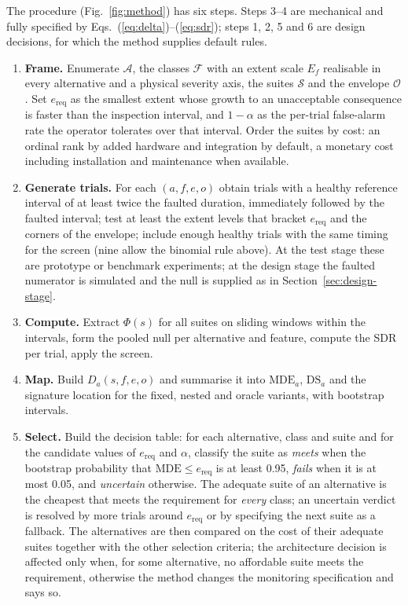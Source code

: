 The procedure (Fig.~\ref{fig:method}) has six steps. Steps 3--4 are mechanical and fully specified by Eqs.~(\ref{eq:delta})--(\ref{eq:sdr}); steps 1, 2, 5 and 6 are design decisions, for which the method supplies default rules.
\begin{enumerate}
  \item \textbf{Frame.} Enumerate $\mathcal{A}$, the classes $\mathcal{F}$ with an extent scale $E_f$ realisable in every alternative and a physical severity axis, the suites $\mathcal{S}$ and the envelope $\mathcal{O}$. Set $e_{\mathrm{req}}$ as the smallest extent whose growth to an unacceptable consequence is faster than the inspection interval, and $1-\alpha$ as the per-trial false-alarm rate the operator tolerates over that interval. Order the suites by cost: an ordinal rank by added hardware and integration by default, a monetary cost including installation and maintenance when available.
  \item \textbf{Generate trials.} For each $(a,f,e,o)$ obtain trials with a healthy reference interval of at least twice the faulted duration, immediately followed by the faulted interval; test at least the extent levels that bracket $e_{\mathrm{req}}$ and the corners of the envelope; include enough healthy trials with the same timing for the screen (nine allow the binomial rule above). At the test stage these are prototype or benchmark experiments; at the design stage the faulted numerator is simulated and the null is supplied as in Section~\ref{sec:design-stage}.
  \item \textbf{Compute.} Extract $\Phi(s)$ for all suites on sliding windows within the intervals, form the pooled null per alternative and feature, compute the SDR per trial, apply the screen.
  \item \textbf{Map.} Build $D_a(s,f,e,o)$ and summarise it into $\mathrm{MDE}_a$, $\mathrm{DS}_a$ and the signature location for the fixed, nested and oracle variants, with bootstrap intervals.
  \item \textbf{Select.} Build the decision table: for each alternative, class and suite and for the candidate values of $e_{\mathrm{req}}$ and $\alpha$, classify the suite as \emph{meets} when the bootstrap probability that $\mathrm{MDE}\le e_{\mathrm{req}}$ is at least 0.95, \emph{fails} when it is at most 0.05, and \emph{uncertain} otherwise. The adequate suite of an alternative is the cheapest that meets the requirement for \emph{every} class; an uncertain verdict is resolved by more trials around $e_{\mathrm{req}}$ or by specifying the next suite as a fallback. The alternatives are then compared on the cost of their adequate suites together with the other selection criteria; the architecture decision is affected only when, for some alternative, no affordable suite meets the requirement, otherwise the method changes the monitoring specification and says so.

\end{enumerate}
